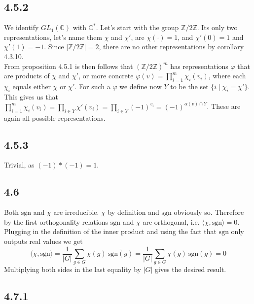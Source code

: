 \documentclass[12pt]{article}
\begin{document}
\subsection*{4.5.2}

We identify $GL_1(\mathbb{C})$ with $\mathbb{C}^*$.
Let's start with the group $\mathbb{Z}/2\mathbb{Z}$. Its only two representations, let's name them $\chi$ and $\chi'$, are $\chi(\cdot) = 1$, and $\chi'(0) = 1$ and $\chi'(1) = -1$. Since $|\mathbb{Z}/2\mathbb{Z}| = 2$, there are no other representations by corollary 4.3.10. \\
From proposition 4.5.1 is then follows that $(\mathbb{Z}/2\mathbb{Z})^m$ has representations $\varphi$ that are products of $\chi$ and $\chi'$, or more concrete $\varphi(v) = \prod_{i = 1}^{m} \chi_i(v_i)$, where each $\chi_i$ equals either $\chi$ or $\chi'$. For such a $\varphi$ we define now $Y$ to be the set $\{i \mid \chi_i = \chi'\}$. This gives us that $\prod_{i = 1}^{m} \chi_i(v_i) = \prod_{i \in Y} \chi'(v_i) = \prod_{i \in Y} (-1)^{v_i} = (-1)^{\alpha(v) \cap Y}$. These are again all possible representations.

\subsection*{4.5.3}

Trivial, as $(-1)*(-1) = 1$.

\subsection*{4.6}

Both $\mathrm{sgn}$ and $\chi$ are irreducible. $\chi$ by definition and $\mathrm{sgn}$ obviously so. Therefore by the first orthogonality relations $\mathrm{sgn}$ and $\chi$ are orthogonal, i.e. $\langle \chi, \mathrm{sgn} \rangle = 0$. Plugging in the definition of the inner product and using the fact that $\mathrm{sgn}$ only outputs real values we get
$$
\langle \chi, \mathrm{sgn} \rangle = \frac{1}{|G|} \sum_{g \in G} \chi(g) \: \overline{\mathrm{sgn}(g)} = \frac{1}{|G|} \sum_{g \in G} \chi(g) \: \mathrm{sgn}(g) = 0
$$
Multiplying both sides in the last equality by $|G|$ gives the desired result.

\subsection*{4.7.1}
\end{document}
